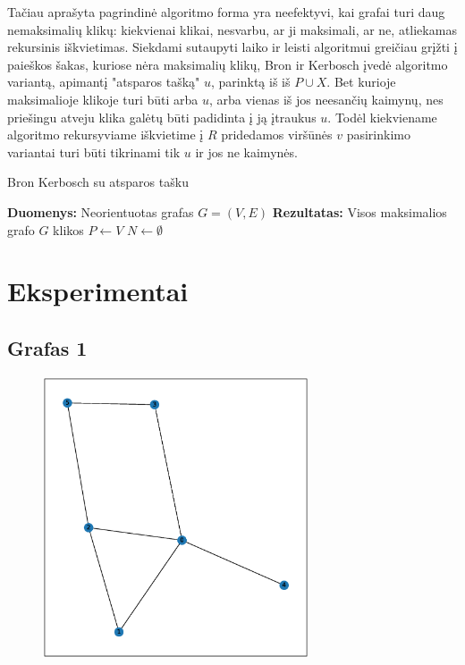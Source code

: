 \documentclass{VUMIFInfKursinis}
\begin{document}
Tačiau aprašyta pagrindinė algoritmo forma yra neefektyvi, kai grafai turi daug nemaksimalių klikų: kiekvienai klikai, nesvarbu, ar ji maksimali, ar ne, atliekamas rekursinis iškvietimas. Siekdami sutaupyti laiko ir leisti algoritmui greičiau grįžti į paieškos šakas, kuriose nėra maksimalių klikų, Bron ir Kerbosch įvedė algoritmo variantą, apimantį "atsparos tašką" $u$, parinktą iš iš $P \cup X$. Bet kurioje maksimalioje klikoje turi būti arba $u$, arba vienas iš jos neesančių kaimynų, nes priešingu atveju klika galėtų būti padidinta į ją įtraukus $u$. Todėl kiekviename algoritmo rekursyviame iškvietime į $R$ pridedamos viršūnės $v$ pasirinkimo variantai turi būti tikrinami tik $u$ ir jos ne kaimynės.

\begin{algorithm}[H]
  \DontPrintSemicolon
  \caption{Bron Kerbosch su atsparos tašku}
  \textbf{Duomenys:} Neorientuotas grafas $G=(V,E)$ \;
  \textbf{Rezultatas:} Visos maksimalios grafo $G$ klikos \;
  $P \gets V$ \;
  $N \gets \emptyset$ \;
\end{algorithm}

\section{Eksperimentai}
\subsection{Grafas 1}
\begin{figure}[H]
  \includegraphics[height=0.7\textwidth,width=0.7\textwidth]{img/graph_1.eps}
\end{figure}
\end{document}
